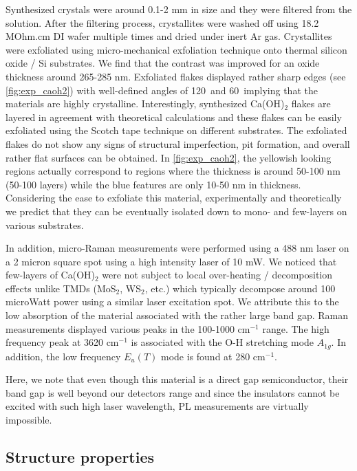 Synthesized crystals were around 0.1-2 mm in size and they 
were filtered from the solution. After the filtering process, crystallites were 
washed off using 18.2 MOhm.cm DI wafer multiple times and dried under inert Ar 
gas. Crystallites were exfoliated using micro-mechanical exfoliation technique 
onto thermal silicon oxide / Si substrates. We find that the contrast 
was improved for an oxide thickness around 265-285 nm.
Exfoliated flakes displayed rather sharp edges (see \autoref{fig:exp_caoh2}) with 
well-defined angles of 120\textdegree ~and 60\textdegree ~implying that the 
materials are highly crystalline. Interestingly, synthesized Ca(OH)$_{2}$ flakes 
are layered in agreement with theoretical calculations and these flakes can be 
easily exfoliated using the Scotch tape technique on different substrates. 
The exfoliated flakes do not show any signs of structural imperfection, pit 
formation, and overall rather flat surfaces can be obtained. In \autoref{fig:exp_caoh2}, the 
yellowish looking regions actually correspond to regions where the thickness is 
around 50-100 nm (50-100 layers) while the blue features are only 10-50 nm in 
thickness. Considering the ease to exfoliate this material, experimentally and 
theoretically we predict that they can be eventually isolated down to mono- and 
few-layers on various substrates.

In addition, micro-Raman measurements were performed using a 488 nm laser on a 
2 micron square spot using a high intensity laser of 10 mW. We noticed that 
few-layers of Ca(OH)$_{2}$ were not subject to local over-heating / 
decomposition effects unlike TMDs (MoS$_2$, 
WS$_2$, etc.) which typically decompose around 100 microWatt power using a 
similar laser excitation spot. We attribute this to the low absorption of the 
material associated with the rather large band gap. Raman measurements 
displayed various peaks in the 100-1000 cm$^{-1}$ range. The high frequency peak 
at 3620 cm$^{-1}$ is associated with the O-H stretching mode $A_{1g}$. In 
addition, the low frequency $E_u(T)$ mode is found at 280 cm$^{-1}$.  

Here, we note that even though this material is a direct gap semiconductor, 
their band gap is well beyond our detectors range and since the insulators 
cannot be excited with such high laser wavelength, PL measurements are 
virtually impossible.

\subsection{Structure properties}\label{strcuture}


